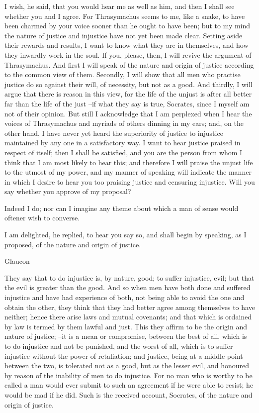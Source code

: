 I wish, he said, that you would hear me as well as him, and then I shall see whether you and I agree. For Thrasymachus seems to me, like a snake, to have been charmed by your voice sooner than he ought to have been; but to my mind the nature of justice and injustice have not yet been made clear. Setting aside their rewards and results, I want to know what they are in themselves, and how they inwardly work in the soul. If you, please, then, I will revive the argument of Thrasymachus. And first I will speak of the nature and origin of justice according to the common view of them. Secondly, I will show that all men who practise justice do so against their will, of necessity, but not as a good. And thirdly, I will argue that there is reason in this view, for the life of the unjust is after all better far than the life of the just --if what they say is true, Socrates, since I myself am not of their opinion. But still I acknowledge that I am perplexed when I hear the voices of Thrasymachus and myriads of others dinning in my ears; and, on the other hand, I have never yet heard the superiority of justice to injustice maintained by any one in a satisfactory way. I want to hear justice praised in respect of itself; then I shall be satisfied, and you are the person from whom I think that I am most likely to hear this; and therefore I will praise the unjust life to the utmost of my power, and my manner of speaking will indicate the manner in which I desire to hear you too praising justice and censuring injustice. Will you say whether you approve of my proposal?

Indeed I do; nor can I imagine any theme about which a man of sense would oftener wish to converse.

I am delighted, he replied, to hear you say so, and shall begin by speaking, as I proposed, of the nature and origin of justice.

Glaucon

They say that to do injustice is, by nature, good; to suffer injustice, evil; but that the evil is greater than the good. And so when men have both done and suffered injustice and have had experience of both, not being able to avoid the one and obtain the other, they think that they had better agree among themselves to have neither; hence there arise laws and mutual covenants; and that which is ordained by law is termed by them lawful and just. This they affirm to be the origin and nature of justice; --it is a mean or compromise, between the best of all, which is to do injustice and not be punished, and the worst of all, which is to suffer injustice without the power of retaliation; and justice, being at a middle point between the two, is tolerated not as a good, but as the lesser evil, and honoured by reason of the inability of men to do injustice. For no man who is worthy to be called a man would ever submit to such an agreement if he were able to resist; he would be mad if he did. Such is the received account, Socrates, of the nature and origin of justice.

